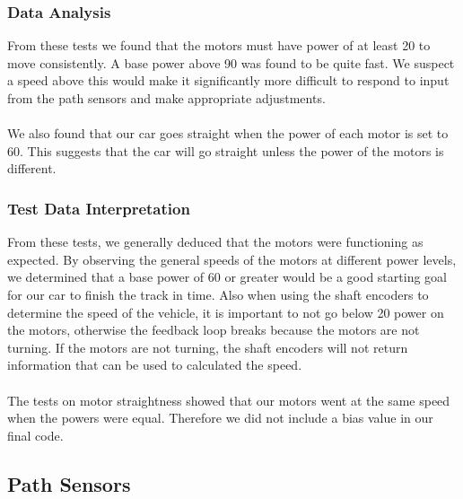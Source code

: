 \documentclass[12pt]{article}
\begin{document}
\subsubsection{Data Analysis}
From these tests we found that the motors must have power of at least 20 to move consistently. A base power above 90 was found to be quite fast. We suspect a speed above this would make it significantly more difficult to respond to input from the path sensors and make appropriate adjustments.
\\ \\ 
We also found that our car goes straight when the power of each motor is set to 60. This suggests that the car will go straight unless the power of the motors is different.

\subsubsection{Test Data Interpretation}
From these tests, we generally deduced that the motors were functioning as expected. By observing the general speeds of the motors at different power levels, we determined that a base power of 60 or greater would be a good starting goal for our car to finish the track in time. Also when using the shaft encoders to determine the speed of the vehicle, it is important to not go below 20 power on the motors, otherwise the feedback loop breaks because the motors are not turning. If the motors are not turning, the shaft encoders will not return information that can be used to calculated the speed.
\\ \\ 
The tests on motor straightness showed that our motors went at the same speed when the powers were equal. Therefore we did not include a bias value in our final code.

\subsection{Path Sensors}
\end{document}
